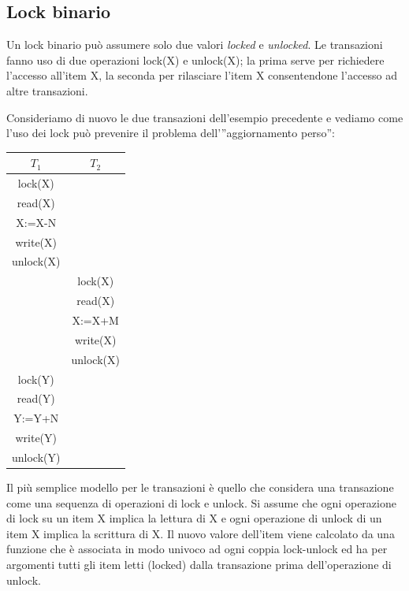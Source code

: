 \subsection{Lock binario}
Un lock binario può assumere solo due valori \textit{locked} e \textit{unlocked}. Le transazioni fanno uso di due operazioni lock(X) e unlock(X); la prima serve per richiedere l'accesso all'item X, la seconda per rilasciare l'item X consentendone l'accesso ad altre transazioni.

Consideriamo di nuovo le due transazioni dell'esempio precedente e vediamo come l'uso dei lock può prevenire il problema dell'”aggiornamento perso”:
\begin{center}
    \begin{tabular}{|c|c|}
        \hline $T_1$&$T_2$ \\\hline
        lock(X)& \\
        read(X)& \\
        X:=X-N& \\
        write(X)& \\
        unlock(X)& \\
        & lock(X)\\
        & read(X)\\
        & X:=X+M\\
        & write(X)\\
        & unlock(X)\\
        lock(Y)& \\
        read(Y)& \\
        Y:=Y+N& \\
        write(Y)& \\
        unlock(Y)& \\\hline
    \end{tabular}
\end{center}

Il più semplice modello per le transazioni è quello che considera una transazione come una sequenza di operazioni di lock e unlock. Si assume che ogni operazione di lock su un item X implica la lettura di X e ogni operazione di unlock di un item X implica la scrittura di X. Il nuovo valore dell'item viene calcolato da una funzione che è associata in modo univoco ad ogni coppia lock-unlock ed ha per argomenti tutti gli item letti (locked) dalla transazione prima dell'operazione di unlock.

